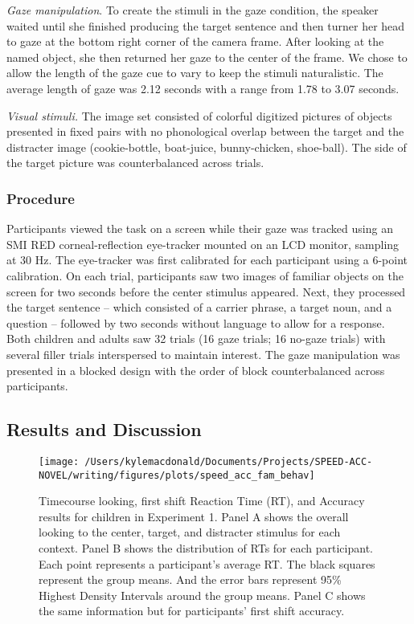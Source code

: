 \documentclass[man,floatsintext]{apa6}
\theoremstyle{definition}
\theoremstyle{definition}
\theoremstyle{definition}
\theoremstyle{remark}
\begin{document}
\emph{Gaze manipulation}. To create the stimuli in the gaze condition,
the speaker waited until she finished producing the target sentence and
then turner her head to gaze at the bottom right corner of the camera
frame. After looking at the named object, she then returned her gaze to
the center of the frame. We chose to allow the length of the gaze cue to
vary to keep the stimuli naturalistic. The average length of gaze was
2.12 seconds with a range from 1.78 to 3.07 seconds.

\emph{Visual stimuli.} The image set consisted of colorful digitized
pictures of objects presented in fixed pairs with no phonological
overlap between the target and the distracter image (cookie-bottle,
boat-juice, bunny-chicken, shoe-ball). The side of the target picture
was counterbalanced across trials.

\subsubsection{Procedure}\label{procedure}

Participants viewed the task on a screen while their gaze was tracked
using an SMI RED corneal-reflection eye-tracker mounted on an LCD
monitor, sampling at 30 Hz. The eye-tracker was first calibrated for
each participant using a 6-point calibration. On each trial,
participants saw two images of familiar objects on the screen for two
seconds before the center stimulus appeared. Next, they processed the
target sentence -- which consisted of a carrier phrase, a target noun,
and a question -- followed by two seconds without language to allow for
a response. Both children and adults saw 32 trials (16 gaze trials; 16
no-gaze trials) with several filler trials interspersed to maintain
interest. The gaze manipulation was presented in a blocked design with
the order of block counterbalanced across participants.

\subsection{Results and Discussion}\label{results-and-discussion}

\begin{figure}[!t]

{\centering \texttt{[image: /Users/kylemacdonald/Documents/Projects/SPEED-ACC-NOVEL/writing/figures/plots/speed\_acc\_fam\_behav]} 

}

\caption{Timecourse looking, first shift Reaction Time (RT), and Accuracy results for children in Experiment 1. Panel A shows the overall looking to the center, target, and distracter stimulus for each context. Panel B shows the distribution of RTs for each participant. Each point represents a participant's average RT. The black squares represent the group means. And the error bars represent 95\% Highest Density Intervals around the group means. Panel C shows the same information but for participants' first shift accuracy.}\label{fig:speed-acc-gaze-results}
\end{figure}
\end{document}
